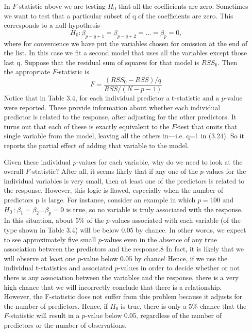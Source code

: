 \begin{description}
\begin{enumerate}
In $F$-statistic above we are testing $H_0$ that all the coefficients are zero. 
Sometimes we want to test that a particular subset of q of the 
coefficients are zero. This corresponds to a null hypothesis
\begin{equation}
H_0 : \beta_{p-q+1} = \beta_{p-q+2} = \dots = \beta_{p} =0,
\end{equation}
where for convenience we have put the variables chosen for 
omission at the end of the list. In this case we fit a second model 
that uses all the variables except those last q. Suppose that the 
residual sum of squares for that model is $RSS_0$. 
Then the appropriate $F$-statistic is
\begin{equation}
F = \frac{(RSS_0 - RSS) / q}{RSS / (N-p-1)}
\end{equation}
Notice that in Table 3.4, for each individual predictor a 
t-statistic and a $p$-value were reported. These provide information 
about whether each individual predictor is related to the response, 
after adjusting for the other predictors. It turns out that each of 
these is exactly equivalent to the $F$-test that omits that single 
variable from the model, leaving all the others in—i.e. q=1 in (3.24). 
So it reports the partial effect of adding that variable to the model.

Given these individual $p$-values for each variable, why do 
we need to look at the overall $F$-statistic? After all, it 
seems likely that if any one of the $p$-values for the individual 
variables is very small, then at least one of the predictors is 
related to the response. However, this logic is flawed, 
especially when the number of predictors p is large.
For instance, consider an example in which $p = 100$ 
and $H_0~:\beta_1 = \beta_2\dots \beta_p=0$ is true, so no variable is truly 
associated with the response. In this situation, about 5\% 
of the $p$-values associated with each variable (of the type shown in Table 3.4) 
will be below 0.05 by chance. In other words, we expect to see approximately 
five small $p$-values even in the absence of any true association 
between the predictors and the response.8 In fact, it is likely that 
we will observe at least one $p$-value below 0.05 by chance!
Hence, if we use the individual t-statistics and associated $p$-values in 
order to decide whether or not there is any association between 
the variables and the response, there is a very high chance that we 
will incorrectly conclude that there is a relationship. However, the 
F-statistic does not suffer from this problem because it adjusts 
for the number of predictors. Hence, if $H_0$ is true, there is 
only a 5\% chance that the $F$-statistic will result in a $p$-value 
below 0.05, regardless of the number of predictors or the number of observations.


\end{enumerate}
\end{description}
